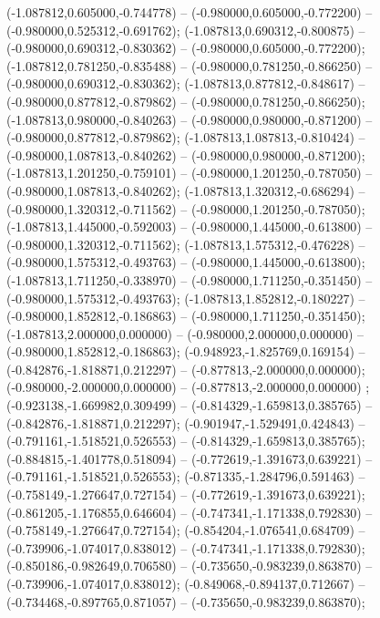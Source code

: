  (-1.087812,0.605000,-0.744778) -- (-0.980000,0.605000,-0.772200) -- (-0.980000,0.525312,-0.691762);
 (-1.087813,0.690312,-0.800875) -- (-0.980000,0.690312,-0.830362) -- (-0.980000,0.605000,-0.772200);
 (-1.087812,0.781250,-0.835488) -- (-0.980000,0.781250,-0.866250) -- (-0.980000,0.690312,-0.830362);
 (-1.087813,0.877812,-0.848617) -- (-0.980000,0.877812,-0.879862) -- (-0.980000,0.781250,-0.866250);
 (-1.087813,0.980000,-0.840263) -- (-0.980000,0.980000,-0.871200) -- (-0.980000,0.877812,-0.879862);
 (-1.087813,1.087813,-0.810424) -- (-0.980000,1.087813,-0.840262) -- (-0.980000,0.980000,-0.871200);
 (-1.087813,1.201250,-0.759101) -- (-0.980000,1.201250,-0.787050) -- (-0.980000,1.087813,-0.840262);
 (-1.087813,1.320312,-0.686294) -- (-0.980000,1.320312,-0.711562) -- (-0.980000,1.201250,-0.787050);
 (-1.087813,1.445000,-0.592003) -- (-0.980000,1.445000,-0.613800) -- (-0.980000,1.320312,-0.711562);
 (-1.087813,1.575312,-0.476228) -- (-0.980000,1.575312,-0.493763) -- (-0.980000,1.445000,-0.613800);
 (-1.087813,1.711250,-0.338970) -- (-0.980000,1.711250,-0.351450) -- (-0.980000,1.575312,-0.493763);
 (-1.087813,1.852812,-0.180227) -- (-0.980000,1.852812,-0.186863) -- (-0.980000,1.711250,-0.351450);
 (-1.087813,2.000000,0.000000) -- (-0.980000,2.000000,0.000000) -- (-0.980000,1.852812,-0.186863);
 (-0.948923,-1.825769,0.169154) -- (-0.842876,-1.818871,0.212297) -- (-0.877813,-2.000000,0.000000);
 (-0.980000,-2.000000,0.000000) -- (-0.877813,-2.000000,0.000000) ;
 (-0.923138,-1.669982,0.309499) -- (-0.814329,-1.659813,0.385765) -- (-0.842876,-1.818871,0.212297);
 (-0.901947,-1.529491,0.424843) -- (-0.791161,-1.518521,0.526553) -- (-0.814329,-1.659813,0.385765);
 (-0.884815,-1.401778,0.518094) -- (-0.772619,-1.391673,0.639221) -- (-0.791161,-1.518521,0.526553);
 (-0.871335,-1.284796,0.591463) -- (-0.758149,-1.276647,0.727154) -- (-0.772619,-1.391673,0.639221);
 (-0.861205,-1.176855,0.646604) -- (-0.747341,-1.171338,0.792830) -- (-0.758149,-1.276647,0.727154);
 (-0.854204,-1.076541,0.684709) -- (-0.739906,-1.074017,0.838012) -- (-0.747341,-1.171338,0.792830);
 (-0.850186,-0.982649,0.706580) -- (-0.735650,-0.983239,0.863870) -- (-0.739906,-1.074017,0.838012);
 (-0.849068,-0.894137,0.712667) -- (-0.734468,-0.897765,0.871057) -- (-0.735650,-0.983239,0.863870);
